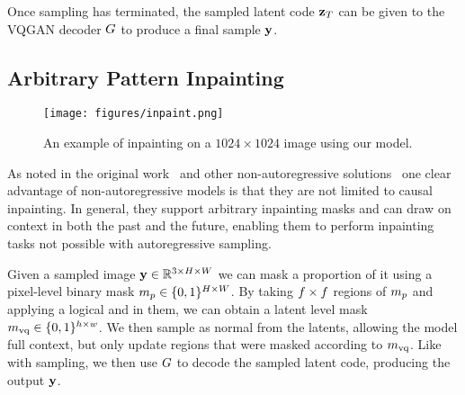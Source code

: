 Once sampling has terminated, the sampled latent code $\mathbf{z}_T$ can be given
to the VQGAN decoder $G$ to produce a final sample $\mathbf{y}$.

\subsection{Arbitrary Pattern Inpainting}

\begin{figure}[t]
    \label{fig:inpaintExample}
    \centering
    \texttt{[image: figures/inpaint.png]}
    \caption{An example of inpainting on a $1024 \times 1024$ image using our
    model.}
\end{figure}

As noted in the original work~\cite{savinov2022stepunrolled} and other
non-autoregressive solutions~\cite{bondtaylor2021unleashing} one clear advantage
of non-autoregressive models is that they are not limited to causal inpainting.
In general, they support arbitrary inpainting masks and can draw on context in
both the past and the future, enabling them to perform inpainting tasks not
possible with autoregressive sampling.

Given a sampled image $\mathbf{y} \in \mathbb{R}^{3 \times H \times W}$ we can mask a
proportion of it using a pixel-level binary mask $m_p \in \{0, 1\}^{H
\times W}$. By taking $f \times f$ regions of
$m_p$ and applying a logical and in them, we can obtain a latent level
mask $m_\textrm{vq} \in \{0,1\}^{h \times w}$. We then sample as normal from the
latents, allowing the model full context, but only update regions that were
masked according to $m_\textrm{vq}$. Like with sampling, we then use $G$
to decode the sampled latent code, producing the output $\mathbf{y}$.
